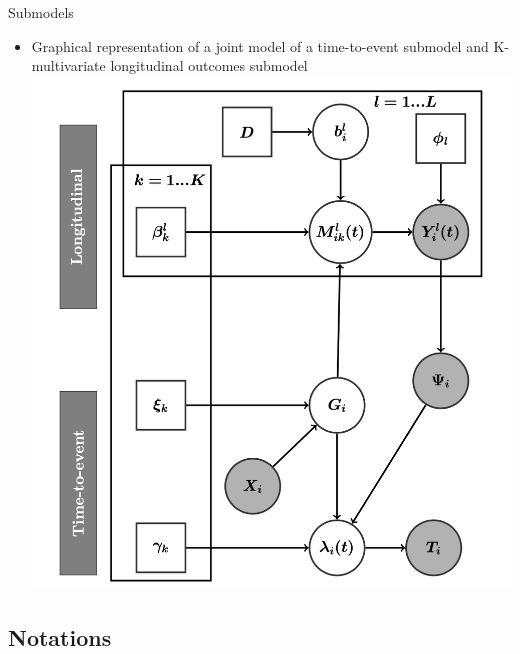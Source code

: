 \documentclass{beamer}
\begin{document}
\begin{frame}{Submodels}
\begin{itemize}
\item Graphical representation of a joint model of a time-to-event submodel and K-multivariate longitudinal outcomes submodel
\includegraphics[scale=0.42]{figures/lights_graphical_representation.png}
\end{itemize}

\end{frame}
\subsection{Notations}
\end{document}
